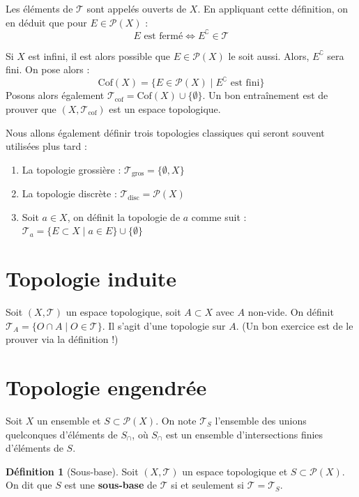 \documentclass[12pt, a4paper]{report}
\theoremstyle{definition}
\newtheorem{definition}{Définition}[chapter]
\begin{document}
Les éléments de $\mathcal{T}$ sont appelés ouverts de $X$. En appliquant cette définition, on en déduit que pour $E \in \mathcal{P}(X)$ :
\[ E \text{ est fermé} \iff E^{\complement} \in \mathcal{T} \]

Si $X$ est infini, il est alors possible que $E \in \mathcal{P}(X)$ le soit aussi. Alors, $E^{\complement}$ sera fini. On pose alors :
\[ \text{Cof}(X) = \{ E \in \mathcal{P}(X) \mid E^{\complement} \text{ est fini} \} \]
Posons alors également $\mathcal{T}_{\text{cof}} = \text{Cof}(X) \cup \{\emptyset\}$. Un bon entraînement est de prouver que $(X, \mathcal{T}_{\text{cof}})$ est un espace topologique.

Nous allons également définir trois topologies classiques qui seront souvent utilisées plus tard :
\begin{enumerate}
	\item La topologie grossière : $\mathcal{T}_{\text{gros}} = \{\emptyset, X\}$
	\item La topologie discrète : $\mathcal{T}_{\text{disc}} = \mathcal{P}(X)$
	\item Soit $a \in X$, on définit la topologie de $a$ comme suit : $\mathcal{T}_{a} = \{E \subset X \mid a \in E\} \cup \{ \emptyset \}$
\end{enumerate}

\section{Topologie induite}
Soit $(X, \mathcal{T})$ un espace topologique, soit $A \subset X$ avec $A$ non-vide. On définit $\mathcal{T}_{A} = \{ O \cap A \mid O \in \mathcal{T}\}$. Il s'agit d'une topologie sur $A$. (Un bon exercice est de le prouver via la définition !)

\section{Topologie engendrée}
Soit $X$ un ensemble et $S \subset \mathcal{P}(X)$. On note $\mathcal{T}_S$ l'ensemble des unions quelconques d'éléments de $S_{\cap}$, où $S_{\cap}$ est un ensemble d'intersections finies d'éléments de $S$.

\begin{definition}[Sous-base]
Soit $(X, \mathcal{T})$ un espace topologique et $S \subset \mathcal{P}(X)$. On dit que $S$ est une \textbf{sous-base} de $\mathcal{T}$ si et seulement si $\mathcal{T} = \mathcal{T}_S$.
\end{definition}
\end{document}

